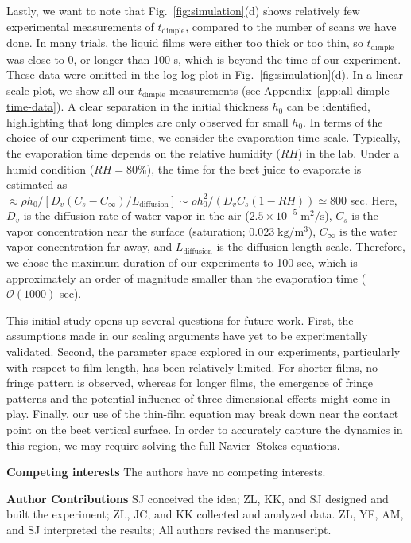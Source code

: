 \documentclass[aps,prfluids,amsmath,amssymb,superscriptaddress,longbibliography]{revtex4-2}
\newif\ifhighlight
\newcommand{\hl}[1]{\ifhighlight\textcolor{blue}{#1}\else#1\fi}
\begin{document}
Lastly, we want to note that Fig.~\ref{fig:simulation}(d) shows relatively few experimental measurements of $t_{\mathrm{dimple}}$, compared to the number of scans we have done. 
In many trials, the liquid films were either too thick or too thin, so $t_{\mathrm{dimple}}$ was close to 0, or longer than 100 s, which is beyond the time of our experiment.  
These data were omitted in the log-log plot in Fig.~\ref{fig:simulation}(d).
In a linear scale plot, we show all our $t_{\mathrm{dimple}}$ measurements (see Appendix~\ref{app:all-dimple-time-data}).
A clear separation in the initial thickness $h_0$ can be identified, highlighting that long dimples are only observed for small $h_0$.
\hl{In terms of the choice of our experiment time, we consider the evaporation time scale. Typically, the evaporation time depends on the relative humidity ($RH$) in the lab. Under a humid condition ($RH = 80\%$), the time for the beet juice to evaporate is estimated as $\approx {\rho h_0}/[D_v {(C_s - C_\infty)}/{L_\mathrm{diffusion}}] \sim {\rho h_0^2}/{(D_vC_s(1-RH))} \simeq 800$ sec. Here, $D_v$ is the diffusion rate of water vapor in the air ($2.5\times 10^{-5}\;\mathrm{m^2/s}$), $C_s$ is the vapor concentration near the surface (saturation; $0.023\;\mathrm{kg/m^3}$), $C_\infty$ is the water vapor concentration far away, and $L_\mathrm{diffusion}$ is the diffusion length scale. Therefore, we chose the maximum duration of our experiments to 100 sec, which is approximately an order of magnitude smaller than the evaporation time ($\mathcal{O} (1000)$ sec).} 


\hl{This initial study opens up several questions for future work. First, the assumptions made in our scaling arguments have yet to be experimentally validated. Second, the parameter space explored in our experiments, particularly with respect to film length, has been relatively limited. For shorter films, no fringe pattern is observed, whereas for longer films, the emergence of fringe patterns and the potential influence of three-dimensional effects might come in play. Finally, our use of the thin-film equation may break down near the contact point on the beet vertical surface. In order to accurately capture the dynamics in this region, we may require solving the full Navier–Stokes equations.}

\noindent\textbf{Competing interests}
The authors have no competing interests.

\noindent\textbf{Author Contributions}
SJ conceived the idea; ZL, KK, and SJ designed and built the experiment; ZL, JC, and KK collected and analyzed data. ZL, YF, AM, and SJ interpreted the results; All authors revised the manuscript. 
\end{document}
